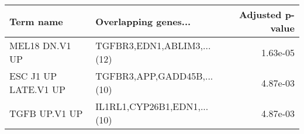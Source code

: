 \begin{tabular}{llr}
\toprule
           Term name &        Overlapping genes... &  Adjusted p-value \\
\midrule
      MEL18 DN.V1 UP &  TGFBR3,EDN1,ABLIM3,...(12) &          1.63e-05 \\
ESC J1 UP LATE.V1 UP &  TGFBR3,APP,GADD45B,...(10) &          4.87e-03 \\
       TGFB UP.V1 UP & IL1RL1,CYP26B1,EDN1,...(10) &          4.87e-03 \\
\bottomrule
\end{tabular}
